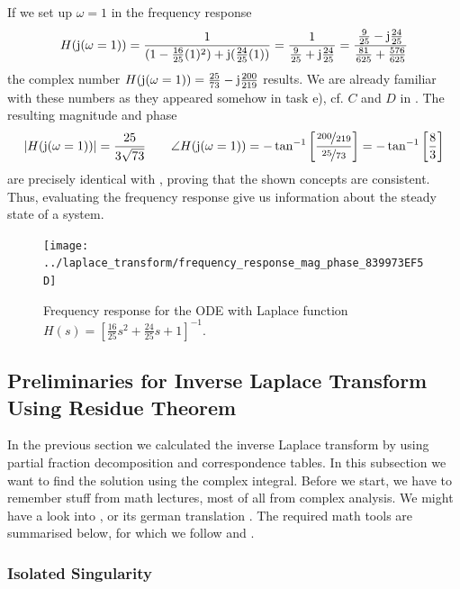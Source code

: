\documentclass[11pt,a4paper,DIV=12]{scrartcl}
\begin{document}
If we set up $\omega=1$ in the frequency response
\begin{align}
H(\im(\omega=1))
= \frac{1}{ (1 -\frac{16}{25} (1)^2) + \im (\frac{24}{25} (1))}
= \frac{1}{ \frac{9}{25} + \im \frac{24}{25}}
= \frac{\frac{9}{25} - \im \frac{24}{25}}{ \frac{81}{625} + \frac{576}{625}}
\end{align}
the complex number $H(\im(\omega=1)) = \frac{25}{73} - \im \frac{200}{219}$ results.
%
We are already familiar with these numbers as they appeared somehow in task e), cf.
$C$ and $D$ in .
%
The resulting magnitude and phase
\begin{equation}
|H(\im(\omega=1))| = \frac{25}{3 \sqrt{73}}
\qquad
\angle H(\im(\omega=1)) = -\tan^{-1}
\left[\frac{\nicefrac{200}{219}}{\nicefrac{25}{73}}\right]
= -\tan^{-1}\left[\frac{8}{3}\right]
\end{equation}
are precisely identical with ,
proving that the shown concepts are consistent.
%
Thus, evaluating the frequency response give us information about the steady
state of a system.
%
\begin{figure}[h!]
\centering
\texttt{[image: ../laplace\_transform/frequency\_response\_mag\_phase\_839973EF5D]}
\caption{Frequency response for the ODE with Laplace function
$H(s) = \left[ \frac{16}{25} s^2 + \frac{24}{25} s + 1 \right]^{-1}$.}
\label{fig:frequency_response_mag_phase} 
\end{figure}
\cleardoublepage
\subsection{Preliminaries for Inverse Laplace Transform Using Residue Theorem}
\label{sec:PrelimResidueTheorem}
%
%
In the previous section we calculated the inverse Laplace transform by using partial fraction decomposition and correspondence tables. In this subsection we want to find the solution using the complex integral.
Before we start, we have to remember stuff from math lectures, most of all from complex analysis.
%
We might have a look into \cite{Strang2007}, or its german translation \cite{Strang2010}.
%
The required math tools are summarised below, for which we follow \cite{Fritzsche2019} and \cite{UlrichWeber2017}.

\subsubsection{Isolated Singularity}
\end{document}
